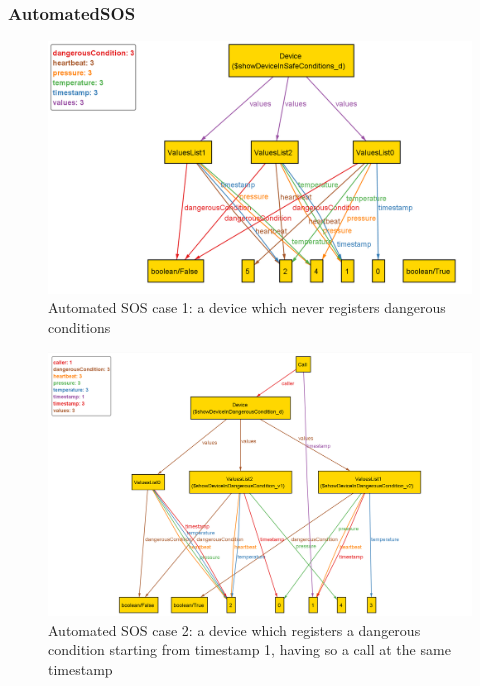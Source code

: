 \newpage
{\color{secblue}\subsubsection{AutomatedSOS}}
\begin{figure}[H]
\includegraphics[width=\linewidth]{./Images/Alloy/automatedSOS_1.png}
\centering
\caption{Automated SOS case 1: a device which never registers dangerous conditions}
\end{figure}
\begin{figure}[H]
\includegraphics[width=\linewidth]{./Images/Alloy/automatedSOS_2.png}
\centering
\caption{Automated SOS case 2: a device which registers a dangerous condition starting from timestamp 1, having so a call at the same timestamp}
\end{figure}

